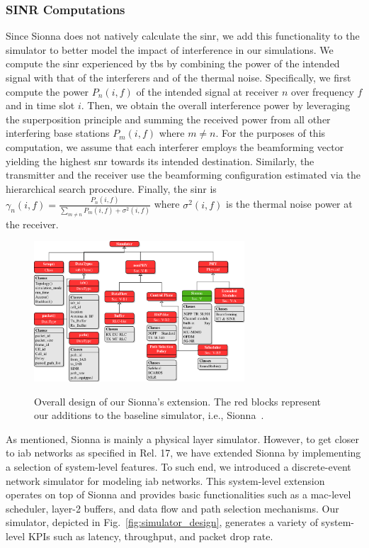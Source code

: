 \subsubsection{SINR Computations}

Since Sionna does not natively calculate the \gls{sinr}, we add this functionality to the simulator to better model the impact of interference in our simulations. We compute the \gls{sinr} experienced by \glspl{tb} by combining the power of the intended signal with that of the interferers and of the thermal noise. Specifically, we first compute the power $P_{n}(i,f)$ of the intended signal at receiver $n$ over frequency $f$ and in time slot $i$. Then, we obtain the overall interference power by leveraging the superposition principle and summing the received power from all other interfering base stations $P_{m} (i, f)$ where $m \neq n$. For the purposes of this computation, we assume that each interferer employs the beamforming vector yielding the highest \gls{snr} towards its intended destination. Similarly, the transmitter and the receiver use the beamforming configuration estimated via the hierarchical search procedure. Finally, the \gls{sinr} is $
\label{EQ_CGAN1}
\gamma_{n} (i, f)= \frac{P_{n}(i,f)}{\sum\limits_{m \neq n} P_{m}(i,f) + \sigma^2(i,f)}
$
where $\sigma^2(i,f)$ is the thermal noise power at the receiver.

\begin{figure}
\centering
\includegraphics[width=0.7\textwidth]{Figures/Safehaul/simulator_diagram.pdf}
\label{bigpicture}
\caption{Overall design of our Sionna's extension. The red blocks represent our additions to the baseline simulator, i.e., Sionna~\cite{hoydis2022sionna}.}
\end{figure}

As mentioned, Sionna is mainly a physical layer simulator. However, to get closer to \gls{iab} networks as specified in Rel. 17, we have extended Sionna by implementing a selection of system-level features. To such end, we introduced a discrete-event network simulator for modeling \gls{iab} networks. This system-level extension operates on top of Sionna and provides basic functionalities such as a \gls{mac}-level scheduler, layer-2 buffers, and data flow and path selection mechanisms. Our simulator, depicted in Fig.~\ref{fig:simulator_design}, generates a variety of system-level KPIs such as latency, throughput, and packet drop rate. 


